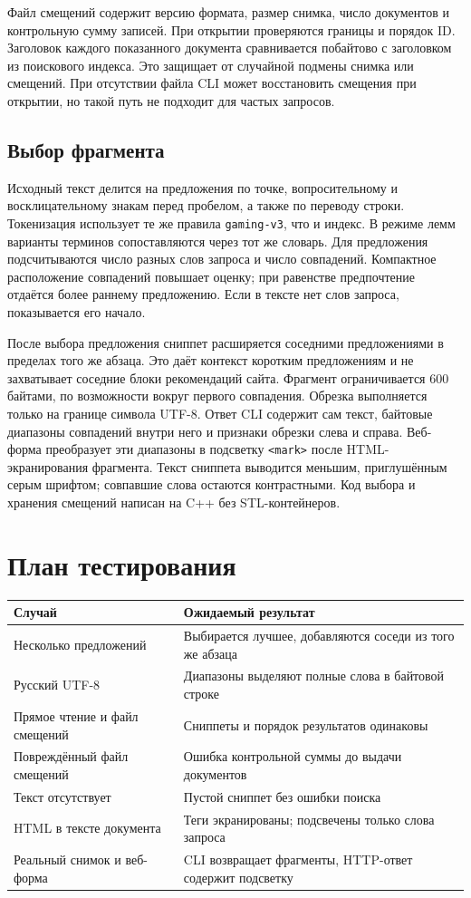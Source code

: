 \documentclass[12pt,a4paper]{article}
\begin{document}
Файл смещений содержит версию формата, размер снимка, число документов
и контрольную сумму записей. При открытии проверяются границы и порядок ID.
Заголовок каждого показанного документа сравнивается побайтово с заголовком
из поискового индекса. Это защищает от случайной подмены снимка или
смещений. При отсутствии файла CLI может восстановить смещения при
открытии, но такой путь не подходит для частых запросов.

\subsection{Выбор фрагмента}
Исходный текст делится на предложения по точке, вопросительному и
восклицательному знакам перед пробелом, а также по переводу строки.
Токенизация использует те же правила \texttt{gaming-v3}, что и индекс.
В режиме лемм варианты терминов сопоставляются через тот же словарь.
Для предложения подсчитываются число разных слов запроса и число
совпадений. Компактное расположение совпадений повышает оценку;
при равенстве предпочтение отдаётся более раннему предложению.
Если в тексте нет слов запроса, показывается его начало.

После выбора предложения сниппет расширяется соседними предложениями
в пределах того же абзаца. Это даёт контекст коротким предложениям и
не захватывает соседние блоки рекомендаций сайта. Фрагмент ограничивается
600 байтами, по возможности вокруг первого совпадения. Обрезка выполняется
только на границе символа UTF-8.
Ответ CLI содержит сам текст, байтовые диапазоны совпадений внутри него
и признаки обрезки слева и справа. Веб-форма преобразует эти диапазоны
в подсветку \texttt{<mark>} после HTML-экранирования фрагмента.
Текст сниппета выводится меньшим, приглушённым серым шрифтом;
совпавшие слова остаются контрастными.
Код выбора и хранения смещений написан на C++ без STL-контейнеров.

\section{План тестирования}
\begin{center}
\small
\begin{tabular}{@{}p{55mm}p{88mm}@{}}
\toprule
Случай & Ожидаемый результат\\
\midrule
Несколько предложений & Выбирается лучшее, добавляются соседи из того же абзаца\\
Русский UTF-8 & Диапазоны выделяют полные слова в байтовой строке\\
Прямое чтение и файл смещений & Сниппеты и порядок результатов одинаковы\\
Повреждённый файл смещений & Ошибка контрольной суммы до выдачи документов\\
Текст отсутствует & Пустой сниппет без ошибки поиска\\
HTML в тексте документа & Теги экранированы; подсвечены только слова запроса\\
Реальный снимок и веб-форма & CLI возвращает фрагменты, HTTP-ответ содержит подсветку\\
\bottomrule
\end{tabular}
\end{center}
\end{document}
